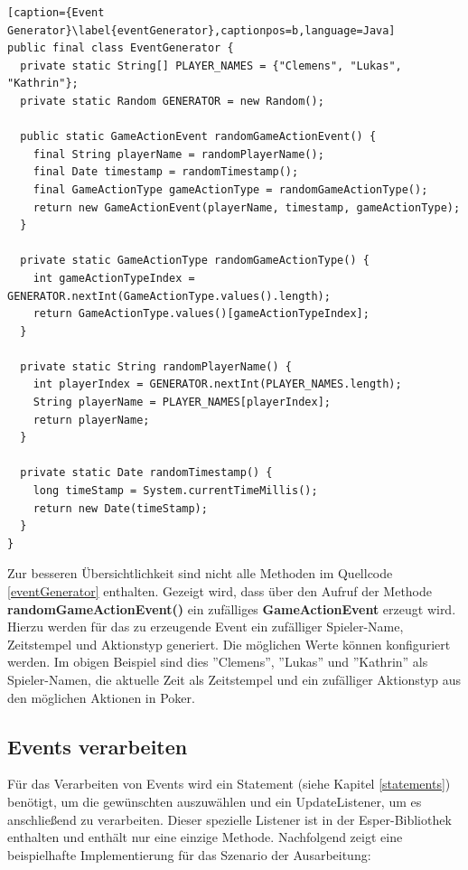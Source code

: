 \begin{lstlisting}[caption={Event Generator}\label{eventGenerator},captionpos=b,language=Java]
public final class EventGenerator {
  private static String[] PLAYER_NAMES = {"Clemens", "Lukas", "Kathrin"};
  private static Random GENERATOR = new Random();
  
  public static GameActionEvent randomGameActionEvent() {
    final String playerName = randomPlayerName();
    final Date timestamp = randomTimestamp();
    final GameActionType gameActionType = randomGameActionType();
    return new GameActionEvent(playerName, timestamp, gameActionType);
  }

  private static GameActionType randomGameActionType() {
    int gameActionTypeIndex = GENERATOR.nextInt(GameActionType.values().length);
    return GameActionType.values()[gameActionTypeIndex];
  }

  private static String randomPlayerName() {
    int playerIndex = GENERATOR.nextInt(PLAYER_NAMES.length);
    String playerName = PLAYER_NAMES[playerIndex];
    return playerName;
  }

  private static Date randomTimestamp() {
    long timeStamp = System.currentTimeMillis();
    return new Date(timeStamp);
  }
}
\end{lstlisting}

Zur besseren Übersichtlichkeit sind nicht alle Methoden im Quellcode \ref{eventGenerator} enthalten.
Gezeigt wird, dass über den Aufruf der Methode \textbf{randomGameActionEvent()} ein zufälliges \textbf{GameActionEvent} erzeugt wird. Hierzu werden für das zu erzeugende Event ein zufälliger Spieler-Name, Zeitstempel und Aktionstyp generiert. Die möglichen Werte können konfiguriert werden. Im obigen Beispiel sind dies ''Clemens'', ''Lukas'' und ''Kathrin'' als Spieler-Namen, die aktuelle Zeit als Zeitstempel und ein zufälliger Aktionstyp aus den möglichen Aktionen in Poker.

\subsection{Events verarbeiten}
\label{EventsVerarbeiten}
Für das Verarbeiten von Events wird ein Statement (siehe Kapitel \ref{statements}) benötigt, um die gewünschten auszuwählen und ein UpdateListener, um es anschließend zu verarbeiten. Dieser spezielle Listener ist in der Esper-Bibliothek enthalten und enthält nur eine einzige Methode. Nachfolgend zeigt eine beispielhafte Implementierung für das Szenario der Ausarbeitung:

